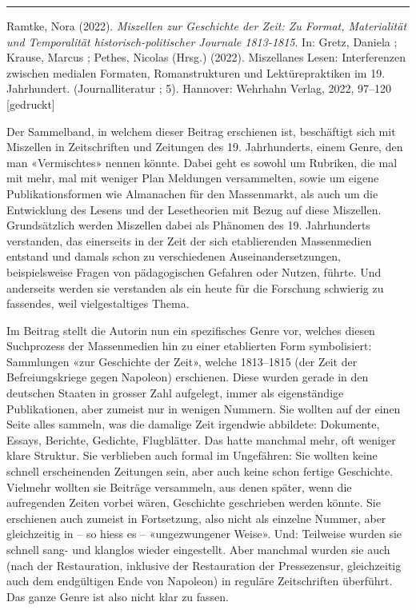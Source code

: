 \documentclass[a4paper,
fontsize=11pt,
oneside,
numbers=noperiodatend,
parskip=half-,
bibliography=totoc,
final
]{scrartcl}
\begin{document}
\begin{center}\rule{0.5\linewidth}{0.5pt}\end{center}

Ramtke, Nora (2022). \emph{Miszellen zur Geschichte der Zeit: Zu Format,
Materialität und Temporalität historisch-politischer Journale
1813-1815}. In: Gretz, Daniela ; Krause, Marcus ; Pethes, Nicolas
(Hrsg.) (2022). Miszellanes Lesen: Interferenzen zwischen medialen
Formaten, Romanstrukturen und Lektürepraktiken im 19. Jahrhundert.
(Journalliteratur ; 5). Hannover: Wehrhahn Verlag, 2022, 97--120
{[}gedruckt{]}

Der Sammelband, in welchem dieser Beitrag erschienen ist, beschäftigt
sich mit Miszellen in Zeitschriften und Zeitungen des 19. Jahrhunderts,
einem Genre, den man «Vermischtes» nennen könnte. Dabei geht es sowohl
um Rubriken, die mal mit mehr, mal mit weniger Plan Meldungen
versammelten, sowie um eigene Publikationsformen wie Almanachen für den
Massenmarkt, als auch um die Entwicklung des Lesens und der Lesetheorien
mit Bezug auf diese Miszellen. Grundsätzlich werden Miszellen dabei als
Phänomen des 19. Jahrhunderts verstanden, das einerseits in der Zeit der
sich etablierenden Massenmedien entstand und damals schon zu
verschiedenen Auseinandersetzungen, beispielsweise Fragen von
pädagogischen Gefahren oder Nutzen, führte. Und anderseits werden sie
verstanden als ein heute für die Forschung schwierig zu fassendes, weil
vielgestaltiges Thema.

Im Beitrag stellt die Autorin nun ein spezifisches Genre vor, welches
diesen Suchprozess der Massenmedien hin zu einer etablierten Form
symbolisiert: Sammlungen «zur Geschichte der Zeit», welche 1813--1815
(der Zeit der Befreiungskriege gegen Napoleon) erschienen. Diese wurden
gerade in den deutschen Staaten in grosser Zahl aufgelegt, immer als
eigenständige Publikationen, aber zumeist nur in wenigen Nummern. Sie
wollten auf der einen Seite alles sammeln, was die damalige Zeit
irgendwie abbildete: Dokumente, Essays, Berichte, Gedichte, Flugblätter.
Das hatte manchmal mehr, oft weniger klare Struktur. Sie verblieben auch
formal im Ungefähren: Sie wollten keine schnell erscheinenden Zeitungen
sein, aber auch keine schon fertige Geschichte. Vielmehr wollten sie
Beiträge versammeln, aus denen später, wenn die aufregenden Zeiten
vorbei wären, Geschichte geschrieben werden könnte. Sie erschienen auch
zumeist in Fortsetzung, also nicht als einzelne Nummer, aber
gleichzeitig in -- so hiess es -- «ungezwungener Weise». Und: Teilweise
wurden sie schnell sang- und klanglos wieder eingestellt. Aber manchmal
wurden sie auch (nach der Restauration, inklusive der Restauration der
Pressezensur, gleichzeitig auch dem endgültigen Ende von Napoleon) in
reguläre Zeitschriften überführt. Das ganze Genre ist also nicht klar zu
fassen.
\end{document}
